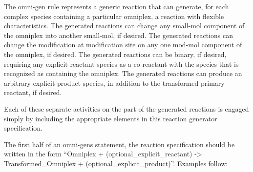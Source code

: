  The omni-gen rule represents a generic reaction that can generate,
 for each complex species containing a particular omniplex, a reaction
 with flexible characteristics. The generated reactions can change any
 small-mol component of the omniplex into another small-mol, if
 desired. The generated reactions can change the modification at
 modification site on any one mod-mol component of the omniplex, if
 desired. The generated reactions can be binary, if desired, requiring
 any explicit reactant species as a co-reactant with the species that
 is recognized as containing the omniplex. The generated reactions can
 produce an arbitrary explicit product species, in addition to the
 transformed primary reactant, if desired. 
 
 Each of these separate activities on the part of the generated
 reactions is engaged simply by including the appropriate elements in
 this reaction generator specification.
 
 The first half of an omni-gens statement, the reaction specification
 should be written in the form ``Omniplex + (optional\_explicit\_reactant) ->
 Transformed\_Omniplex + (optional\_explicit\_product)''.  Examples follow:

